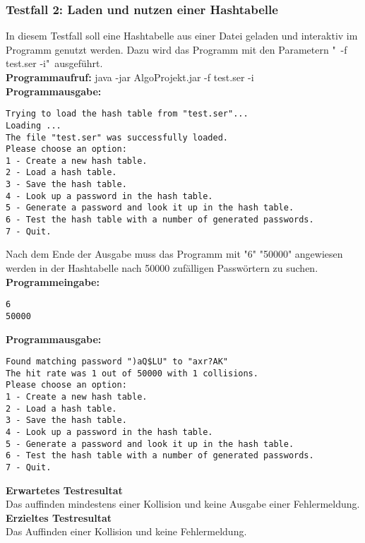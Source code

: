 \documentclass[11pt]{article}
\begin{document}
\subsubsection{Testfall 2: Laden und nutzen einer Hashtabelle}
In diesem Testfall soll eine Hashtabelle aus einer Datei geladen und interaktiv im Programm genutzt werden. Dazu wird das Programm mit den Parametern "\ -f test.ser -i"\ ausgeführt.\\
\textbf{Programmaufruf:} java -jar AlgoProjekt.jar -f test.ser -i \\
\textbf{Programmausgabe:}
\begin{verbatim}
Trying to load the hash table from "test.ser"...
Loading ...
The file "test.ser" was successfully loaded.
Please choose an option:
1 - Create a new hash table.
2 - Load a hash table.
3 - Save the hash table.
4 - Look up a password in the hash table.
5 - Generate a password and look it up in the hash table.
6 - Test the hash table with a number of generated passwords.
7 - Quit.
\end{verbatim}
Nach dem Ende der Ausgabe muss das Programm mit "6" "50000" angewiesen werden in der Hashtabelle nach 50000 zufälligen Passwörtern zu suchen.\\
\textbf{Programmeingabe:}
\begin{verbatim}
6
50000
\end{verbatim}
\textbf{Programmausgabe:}
\begin{verbatim}
Found matching password ")aQ$LU" to "axr?AK"
The hit rate was 1 out of 50000 with 1 collisions.
Please choose an option:
1 - Create a new hash table.
2 - Load a hash table.
3 - Save the hash table.
4 - Look up a password in the hash table.
5 - Generate a password and look it up in the hash table.
6 - Test the hash table with a number of generated passwords.
7 - Quit.
\end{verbatim}
\textbf{Erwartetes Testresultat}\\
Das auffinden mindestens einer Kollision und keine Ausgabe einer Fehlermeldung.\\
\textbf{Erzieltes Testresultat}\\
Das Auffinden einer Kollision und keine Fehlermeldung.
\newpage
\end{document}
